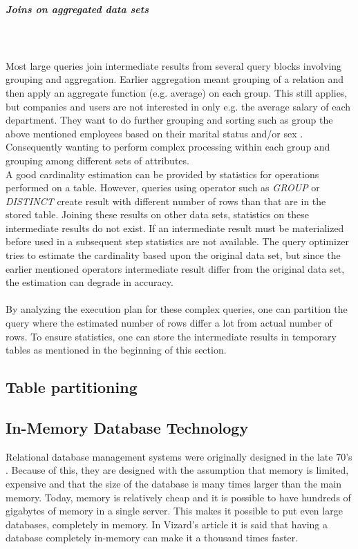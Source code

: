 \documentclass{cslthse-msc}
\begin{document}
\subparagraph{Joins on aggregated data sets}\mbox{}\\\\
Most large queries join intermediate results from several query blocks involving grouping and aggregation. Earlier aggregation meant grouping of a relation and then apply an aggregate function (e.g. average) on each group. This still applies, but companies and users are not interested in only e.g. the average salary of each department. They want to do further grouping and sorting such as group the above mentioned employees based on their marital status and/or sex   \cite{partioned}. Consequently wanting to perform complex processing within each group and grouping among different sets of attributes.\\ A good cardinality estimation can be provided by statistics for operations performed on a table. However, queries using operator such as \textit{GROUP} or \textit{DISTINCT} create result with different number of rows than that are in the stored table. Joining these results on other data sets, statistics on these intermediate results do not exist. If an intermediate result must be materialized before used in a subsequent step statistics are not available. The query optimizer tries to estimate the cardinality based upon the original data set, but since the earlier mentioned operators intermediate result differ from the original data set, the estimation can degrade in accuracy.\\\\ By analyzing the execution plan for these complex queries, one can partition the query where the estimated number of rows differ a lot from actual number of rows. To ensure statistics, one can store the intermediate results in temporary tables as mentioned in the beginning of this section.     

\subsection{Table partitioning}
\cite{tablepartitioningbenefit}
\cite{tablepartitioning}
 
\subsection{In-Memory Database Technology}
Relational database management systems were originally designed in the late 70's   \cite{Nevarez}. Because of this, they are designed with the assumption that memory is limited, expensive and that the size of the database is many times larger than the main memory. Today, memory is relatively cheap and it is possible to have hundreds of gigabytes of memory in a single server. This makes it possible to put even large databases, completely in memory. In Vizard's article   \cite{Vizard12} it is said that having a database completely in-memory can make it a thousand times faster.
\end{document}
